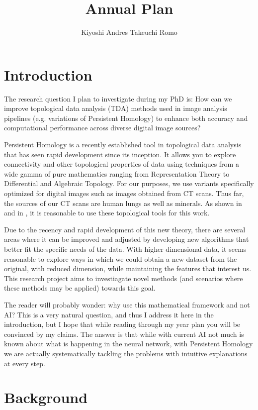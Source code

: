 \documentclass[12pt]{article}
\title{Annual Plan}
\author{Kiyoshi Andres Takeuchi Romo}
\theoremstyle{theorem}
\theoremstyle{definition}
\theoremstyle{remark}
\theoremstyle{gremark}
\theoremstyle{discussion}
\theoremstyle{notation}
\begin{document}
	
	\maketitle
	
	\section*{Introduction}
	
		The research question I plan to investigate during my PhD is: How can we improve topological data analysis (TDA) methods used in image analysis pipelines (e.g. variations of Persistent Homology) to enhance both accuracy and computational performance across diverse digital image sources?
		
		Persistent Homology is a recently established tool in topological data analysis that has seen rapid development since its inception. It allows you to explore connectivity and other topological properties of data using techniques from a wide gamma of pure mathematics ranging from Representation Theory to Differential and Algebraic Topology. For our purposes, we use variants specifically optimized for digital images such as images obtained from CT scans. Thus far, the sources of our CT scans are human lungs as well as minerals. As shown in \cite{https://doi.org/10.1002/2015WR017937} and in \cite{belchi_lung_2018}, it is reasonable to use these topological tools for this work. 
		
		Due to the recency and rapid development of this new theory, there are several areas where it can be improved and adjusted by developing new algorithms that better fit the specific needs of the data. With higher dimensional data, it seems reasonable to explore ways in which we could obtain a new dataset from the original, with reduced dimension, while maintaining the features that interest us. This research project aims to investiagate novel methods (and scenarios where these methods may be applied) towards this goal.
		
		The reader will probably wonder: why use this mathematical framework and not AI? This is a very natural question, and thus I address it here in the introduction, but I hope that while reading through my year plan you will be convinced by my claims. The answer is that while with current AI not much is known about what is happening in the neural network, with Persistent Homology we are actually systematically tackling the problems with intuitive explanations at every step.
	
	\section*{Background}
	
\end{document}
